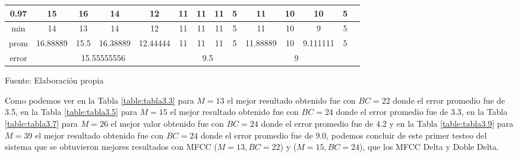\begin{center}
\begin{table}[H]
{\begin{tabular}{|c|c|c|c|c|c|c|c|c|c|c|c|c|c|}
\hline 
0.97 & 
15 & 16 & 14 & 12 & 11 & 11 & 11 & 5 & 11 & 10 & 10 & 5 \\
\hline 
min & 
14 & 13 & 14 & 12 & 11 & 11 & 11 & 5 & 11 & 10 & 9 & 5 \\
\hline 
prom & 
16.88889 & 15.5 & 16.38889 & 12.44444 & 11 & 11 & 11 & 5 & 11.88889 & 10 & 9.111111 & 5 \\
\hline 
error & 
\multicolumn{4}{c|}{15.55555556} & 
\multicolumn{4}{c|}{9.5} & 
\multicolumn{4}{c|}{9}\\ 
\hline 
\end{tabular} 
}
\begin{center}
\vskip 0.2cm
{\small{Fuente: Elaboración propia}}
\end{center}
\end{table}
\end{center}

\vskip -0.5cm
Como podemos ver en la Tabla \ref{table:tabla3.3} para $M = 13$ el mejor resultado obtenido fue con $BC = 22$ donde el error promedio fue de 3.5, en la Tabla \ref{table:tabla3.5} para $M = 15$ el mejor resultado obtenido fue con $BC = 24$ donde el error promedio fue de 3.3, en la Tabla \ref{table:tabla3.7} para $M = 26$ el mejor valor obtenido fue con $BC = 24$ donde el error promedio fue de 4.2 y en la Tabla \ref{table:tabla3.9} para $M = 39$ el mejor resultado obtenido fue con $BC = 24$ donde el error promedio fue de 9.0, podemos concluir de este primer testeo del sistema que se obtuvieron mejores resultados con MFCC ($M = 13, BC = 22$) y ($M = 15, BC = 24$), que los MFCC Delta y Doble Delta.


